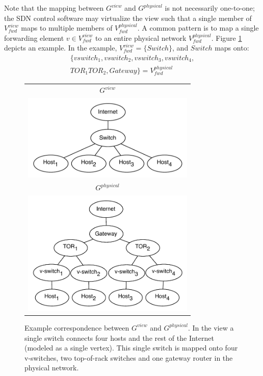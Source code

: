 \documentclass{sig-alternate-10pt}
\begin{document}
Note that the mapping between $G^{view}$ and $G^{physical}$ is not
necessarily one-to-one; the SDN control software may virtualize the view
such that a single member of $V_{fwd}^{view}$ maps to multiple members of
$V_{fwd}^{physical}$. A common pattern is to map a single forwarding element $v \in V_{fwd}^{view}$ to
an entire physical network $V_{fwd}^{physical}$. Figure \ref{fig:view_and_physical}
depicts an example. In the example, $V_{fwd}^{view} = \{ Switch \}$, and
$Switch$ maps onto:
\begin{align*}
\{ vswitch_1, vswitch_2, vswitch_3,  vswitch_4, \\
TOR_1 TOR_2, Gateway \} = V_{fwd}^{physical} 
\end{align*}

\begin{figure}[t]
\hspace{-10pt}
\begin{tabular}{c}
    $G^{view}$ \\
    \includegraphics[width=3.25in]{../diagrams/necula_views/app_view.pdf}  \\
    $G^{physical}$ \\
    \includegraphics[width=3.25in]{../diagrams/necula_views/physical_view.pdf}
\end{tabular}
\caption[]{\label{fig:view_and_physical} Example correspondence between
$G^{view}$ and $G^{physical}$. In the view a single switch connects 
four hosts and the rest of the Internet (modeled as a single vertex).
This single switch is mapped onto four v-switches, two top-of-rack switches 
and one gateway router in the physical network.}
\end{figure}
\end{document}
